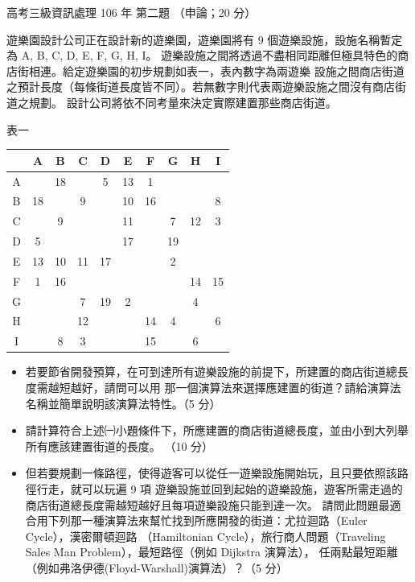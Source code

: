 \begin{pastexam}[label={px:gk3-106-ds-02}]{高考三級資訊處理 106 年 第二題}
（申論；20 分）

遊樂園設計公司正在設計新的遊樂園，遊樂園將有 9 個遊樂設施，設施名稱暫定為 A, B, C, D, E, F, G, H, I。
遊樂設施之間將透過不盡相同距離但極具特色的商店街相連。給定遊樂園的初步規劃如表一，表內數字為兩遊樂
設施之間商店街道之預計長度（每條街道長度皆不同）。若無數字則代表兩遊樂設施之間沒有商店街道之規劃。
設計公司將依不同考量來決定實際建置那些商店街道。
\begin{center}
表一\\[2pt]
\small
\begin{tabular}{|c|*{9}{c|}}
\hline
 & A & B & C & D & E & F & G & H & I \\ \hline
A &    & 18 &    & 5  & 13 & 1  &    &    &    \\ \hline
B & 18 &    & 9  &    & 10 & 16 &    &    & 8  \\ \hline
C &    & 9  &    &    & 11 &    & 7  & 12 & 3  \\ \hline
D & 5  &    &    &    & 17 &    & 19 &    &    \\ \hline
E & 13 & 10 & 11 & 17 &    &    & 2  &    &    \\ \hline
F & 1  & 16 &    &    &    &    &    & 14 & 15 \\ \hline
G &    &    & 7  & 19 & 2  &    &    & 4  &    \\ \hline
H &    &    & 12 &    &    & 14 & 4  &    & 6  \\ \hline
I &    & 8  & 3  &    &    & 15 &    & 6  &    \\ \hline
\end{tabular}
\end{center}
\begin{itemize}[leftmargin=2.2em]
\item[㈠] 若要節省開發預算，在可到達所有遊樂設施的前提下，所建置的商店街道總長度需越短越好，請問可以用
那一個演算法來選擇應建置的街道？請給演算法名稱並簡單說明該演算法特性。（5 分）
\item[㈡] 請計算符合上述㈠小題條件下，所應建置的商店街道總長度，並由小到大列舉所有應該建置街道的長度。
（10 分）
\item[㈢] 但若要規劃一條路徑，使得遊客可以從任一遊樂設施開始玩，且只要依照該路徑行走，就可以玩遍 9 項
遊樂設施並回到起始的遊樂設施，遊客所需走過的商店街道總長度需越短越好且每項遊樂設施只能到達一次。
請問此問題最適合用下列那一種演算法來幫忙找到所應開發的街道：尤拉迴路（Euler Cycle），漢密爾頓迴路
（Hamiltonian Cycle），旅行商人問題（Traveling Sales Man Problem），最短路徑（例如 Dijkstra 演算法），
任兩點最短距離（例如弗洛伊德(Floyd-Warshall)演算法）？（5 分）
\end{itemize}
\end{pastexam}

